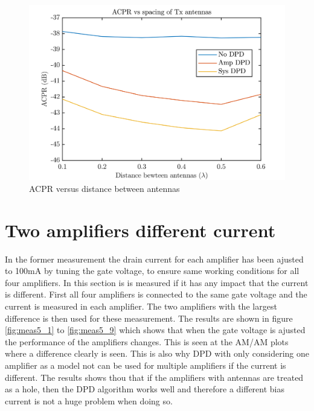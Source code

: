 \begin{figure}[H]
\centering 
\includegraphics[scale = 0.6]{figures/measurement/cree/meas4/acpr_four_ant.png}
\caption{ACPR versus distance between antennas}
\label{fig:meas4_dpd}
\end{figure}





\section{Two amplifiers different current}
In the former measurement the drain current for each amplifier has been ajusted to 100mA by tuning the gate voltage, to ensure same working conditions for all four amplifiers. In this section is is measured if it has any impact that the current is different. First all four amplifiers is connected to the same gate voltage and the current is measured in each amplifier. The two amplifiers with the largest difference is then used for these measurement. The results are shown in figure \ref{fig:meas5_1} to \ref{fig:meas5_9} which shows that when the gate voltage is ajusted the performance of the amplifiers changes. This is seen at the AM/AM plots where a difference clearly is seen. This is also why DPD with only considering one amplifier as a model not can be used for multiple amplifiers if the current is different. The results shows thou that if the amplifiers with antennas are treated as a hole, then the DPD algorithm works well and therefore a different bias current is not a huge problem when doing so.


